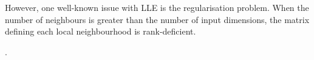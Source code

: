 However, one well-known issue with LLE is the regularisation problem. When the number of neighbours is greater than the number of input dimensions, the matrix defining each local neighbourhood is rank-deficient. 

%


.

